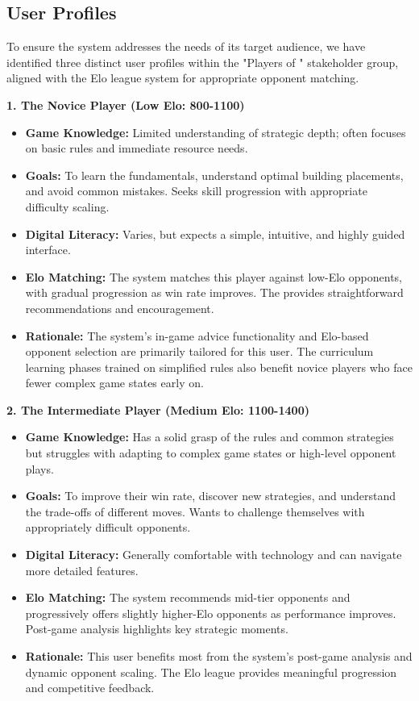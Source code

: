 \documentclass{article}
\begin{document}
\subsection{User Profiles}\label{subsec:User Profiles}
To ensure the system addresses the needs of its target audience, we have identified three distinct user profiles within the "Players of \emph{\Catan{}}" stakeholder group, aligned with the Elo league system for appropriate opponent matching.

\hspace{1cm}

\noindent\textbf{1. The Novice Player (Low Elo: 800-1100)}
\begin{itemize}
    \item \textbf{Game Knowledge:} Limited understanding of strategic depth; often focuses on basic rules and immediate resource needs.
    \item \textbf{Goals:} To learn the fundamentals, understand optimal building placements, and avoid common mistakes. Seeks skill progression with appropriate difficulty scaling.
    \item \textbf{Digital Literacy:} Varies, but expects a simple, intuitive, and highly guided interface.
    \item \textbf{Elo Matching:} The system matches this player against low-Elo opponents, with gradual progression as win rate improves. The \AI{} provides straightforward recommendations and encouragement.
    \item \textbf{Rationale:} The system's in-game advice functionality and Elo-based opponent selection are primarily tailored for this user. The curriculum learning phases trained on simplified rules also benefit novice players who face fewer complex game states early on.
\end{itemize}

\noindent\textbf{2. The Intermediate Player (Medium Elo: 1100-1400)}
\begin{itemize}
    \item \textbf{Game Knowledge:} Has a solid grasp of the rules and common strategies but struggles with adapting to complex game states or high-level opponent plays.
    \item \textbf{Goals:} To improve their win rate, discover new strategies, and understand the trade-offs of different moves. Wants to challenge themselves with appropriately difficult opponents.
    \item \textbf{Digital Literacy:} Generally comfortable with technology and can navigate more detailed features.
    \item \textbf{Elo Matching:} The system recommends mid-tier opponents and progressively offers slightly higher-Elo opponents as performance improves. Post-game analysis highlights key strategic moments.
    \item \textbf{Rationale:} This user benefits most from the system's post-game analysis and dynamic opponent scaling. The Elo league provides meaningful progression and competitive feedback.
\end{itemize}
\end{document}
